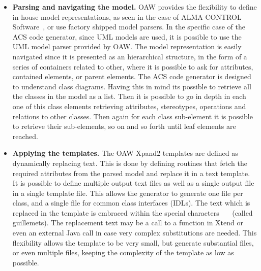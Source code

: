 \begin{itemize}
  \item{\textbf{Parsing and navigating the model.}}
  OAW provides the flexibility to define
  in house model representations,
  as seen in the case of ALMA CONTROL Software~\cite{farris06:_generating_software_modules},
  or use factory shipped model parsers.
  In the specific case of the ACS code generator,
  since UML models are used,
  it is possible to use the UML model parser provided
  by OAW.
  The model representation is easily navigated
  since it is presented as an hierarchical structure,
  in the form of a series of containers related to other,
  where it is possible to ask for
  attributes, contained elements, or parent elements.
  The ACS code generator is designed to
  understand class diagrams.
  Having this in mind its possible to retrieve all
  the classes in the model as a list.
  Then it is possible to go in depth in each one of this
  class elements retrieving attributes, stereotypes, operations
  and relations to other classes.
  Then again for each class sub-element it is possible
  to retrieve their sub-elements, so on and so forth
  until leaf elements are reached.

  \item{\textbf{Applying the templates.}}
  The OAW Xpand2 templates are defined as
  dynamically replacing text.
  This is done by defining routines that
  fetch the required attributes from the parsed
  model and
  replace it in a text template.
  It is possible to define multiple output text files
  as well as a single output file
  in a single template file.
  This allows the generator to generate one file
  per class, and
  a single file for common class interfaces (IDLs).
  The text which is replaced in the template
  is embraced within the special characters
  \textbf{\flqq~~\frqq} (called guillemets).
  The replacement text may be a call
  to a function in Xtend or even an external Java
  call in case very complex substitutions are needed.
  This flexibility allows the template to be very small,
  but generate substantial files, or even multiple files,
  keeping the complexity of the template as low as possible.
\end{itemize}


